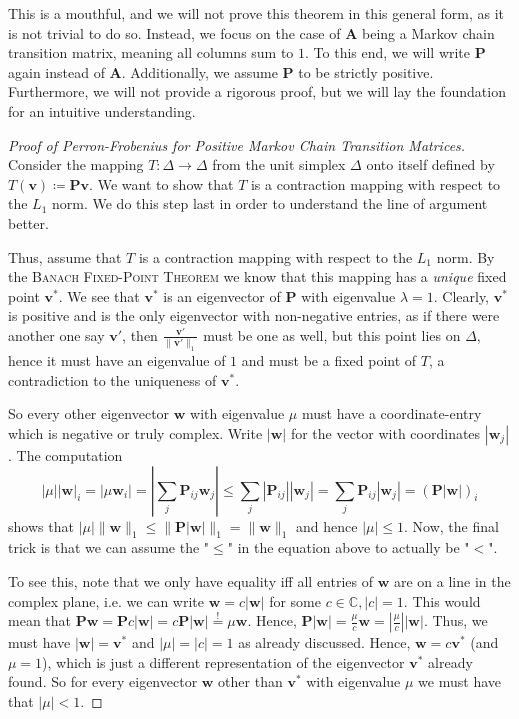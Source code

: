 \documentclass[../../main.tex]{subfiles}
\begin{document}
This is a mouthful, and we will not prove this theorem in this general form, as it is not trivial to do so. Instead, we focus on the case of $\bm{A}$ being a Markov chain transition matrix, meaning all columns sum to $1$. To this end, we will write $\bm{P}$ again instead of $\bm{A}$. Additionally, we assume $\bm{P}$ to be strictly positive. Furthermore, we will not provide a rigorous proof, but we will lay the foundation for an intuitive understanding.

\begin{proof}[Proof of Perron-Frobenius for Positive Markov Chain Transition Matrices]
    ~\\
    Consider the mapping $T: \Delta \to \Delta$ from the unit simplex $\Delta$ onto itself defined by $T(\bm{v}) \coloneqq \bm{Pv}$. We want to show that $T$ is a contraction mapping with respect to the $L_1$ norm. We do this step last in order to understand the line of argument better.
    
    Thus, assume that $T$ is a contraction mapping with respect to the $L_1$ norm. By the \textsc{Banach Fixed-Point Theorem} we know that this mapping has a \emph{unique} fixed point $\bm{v}^*$. We see that $\bm{v}^*$ is an eigenvector of $\bm{P}$ with eigenvalue $\lambda = 1$. Clearly, $\bm{v}^*$ is positive and is the only eigenvector with non-negative entries, as if there were another one say $\bm{v}'$, then $\frac{\bm{v}'}{\|\bm{v}'\|_1}$ must be one as well, but this point lies on $\Delta$, hence it must have an eigenvalue of $1$ and must be a fixed point of $T$, a contradiction to the uniqueness of $\bm{v}^*$.

    So every other eigenvector $\bm{w}$ with eigenvalue $\mu$ must have a coordinate-entry which is negative or truly complex. Write $|\bm{w}|$ for the vector with coordinates $|\bm{w}_j|$. The computation
    \[
        |\mu||\bm{w}|_i = |\mu \bm{w}_i| = |\sum_{j} \bm{P}_{ij} \bm{w}_j| \leq \sum_{j} |\bm{P}_{ij}| |\bm{w}_j| = \sum_{j} \bm{P}_{ij} |\bm{w}_j| = (\bm{P} |\bm{w}|)_i
    \]
    shows that $|\mu| \|\bm{w}\|_1 \leq \|\bm{P} |\bm{w}|\|_1 = \|\bm{w}\|_1$ and hence $|\mu| \leq 1$. Now, the final trick is that we can assume the "$\leq$" in the equation above to actually be "$<$".

    To see this, note that we only have equality iff all entries of $\bm{w}$ are on a line in the complex plane, i.e. we can write $\bm{w} = c |\bm{w}|$ for some $c \in \mathbb{C}, |c| = 1$. This would mean that $\bm{P} \bm{w} = \bm{P} c |\bm{w}| = c \bm{P} |\bm{w}| \overset{!}{=} \mu \bm{w}$. Hence, $\bm{P} |\bm{w}| = \frac{\mu}{c} \bm{w} = |\frac{\mu}{c}| |\bm{w}|$. Thus, we must have $|\bm{w}| = \bm{v}^*$ and $|\mu| = |c| = 1$ as already discussed. Hence, $\bm{w} = c \bm{v}^*$ (and $\mu = 1$), which is just a different representation of the eigenvector $\bm{v}^*$ already found. So for every eigenvector $\bm{w}$ other than $\bm{v}^*$ with eigenvalue $\mu$ we must have that $|\mu| < 1$.


\end{proof}
\end{document}
